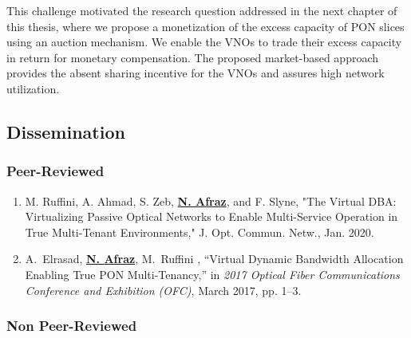 This challenge motivated the research question addressed in the next chapter of this thesis, where we propose a monetization of the excess capacity of \ac{PON} slices using an auction mechanism. We enable the \acp{VNO} to trade their excess capacity in return for monetary compensation. The proposed market-based approach provides the absent sharing incentive for the \acp{VNO} and assures high network utilization.






\subsection{Dissemination}

\subsubsection{Peer-Reviewed}

 \begin{enumerate}
    \item M. Ruffini, A. Ahmad, S. Zeb, \textbf{\underline{N. {Afraz}}}, and F. Slyne, "The Virtual DBA: Virtualizing Passive Optical Networks to Enable Multi-Service Operation in True Multi-Tenant Environments," J. Opt. Commun. Netw., Jan. 2020.
    

    \item A.~{Elrasad}, \textbf{\underline{N. {Afraz}}}, M.~{Ruffini} , ``Virtual Dynamic Bandwidth Allocation Enabling True PON Multi-Tenancy,'' in \emph{2017 Optical Fiber Communications Conference and Exhibition (OFC)}, March 2017, pp. 1--3.

 \end{enumerate}
 \subsubsection{Non Peer-Reviewed}
